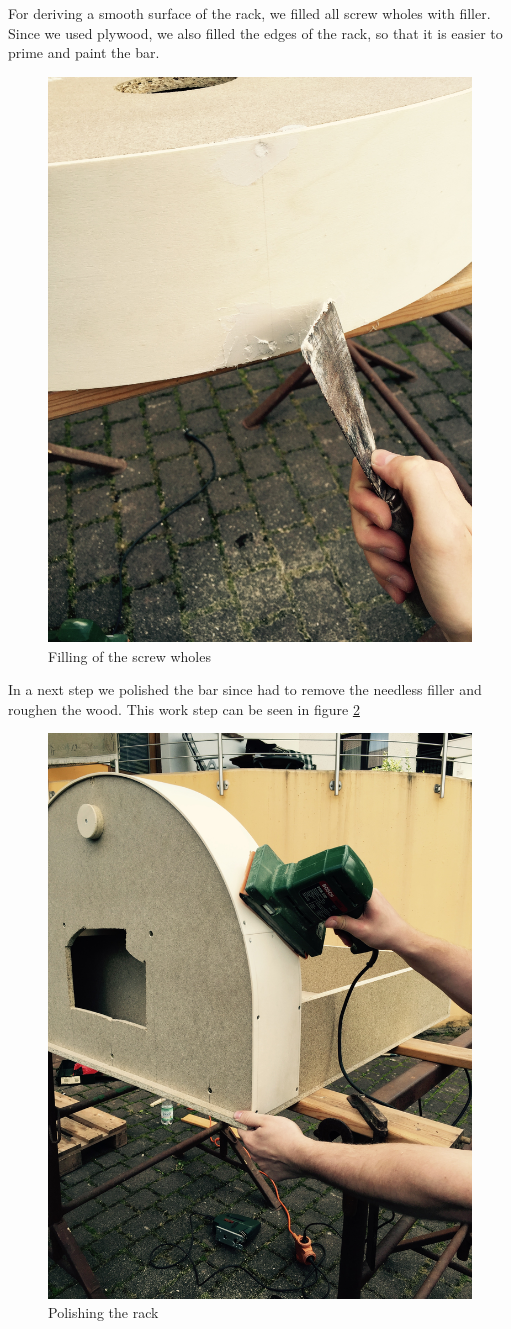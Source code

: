 \documentclass{acm_proc_article-sp}
\begin{document}
For deriving a smooth surface of the rack, we filled all screw wholes with filler. Since we used plywood, we also filled the edges of the rack, so that it is easier to prime and paint the bar. 

\begin{figure}[htbp]  
  \centering
     \includegraphics[width=0.5\linewidth]{pictures/filling.jpg}
  \caption{Filling of the screw wholes}
  \label{fig:filling}
\end{figure}

In a next step we polished the bar since had to remove the needless filler and roughen the wood. This work step can be seen in figure \ref{fig:polishing}
 
\begin{figure}[htbp] 
  \centering
     \includegraphics[width=0.5\linewidth]{pictures/polishing.jpg}
  \caption{Polishing the rack}
  \label{fig:polishing}
\end{figure}
\end{document}
